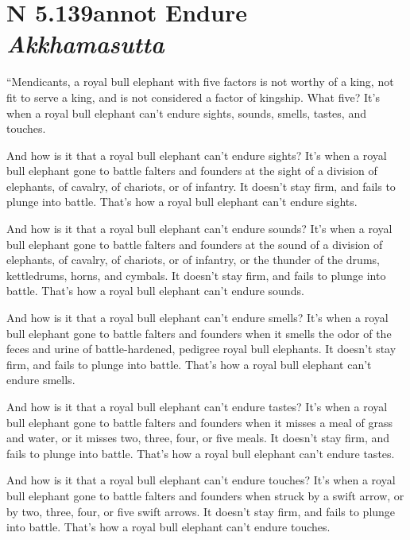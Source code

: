 \documentclass[12pt,openany]{book}%
\newcommand*{\suttatitleacronym}[1]{\smaller[2]{#1}\vspace*{.3em}}
\newcommand*{\suttatitletranslation}[1]{\linebreak{#1}}
\newcommand*{\suttatitleroot}[1]{\linebreak\smaller[2]\itshape{#1}}
\newcommand*{\tocacronym}[1]{\hspace*{-3.3em}{#1}\quad}
\newcommand*{\toctranslation}[1]{#1}
\newcommand*{\tocroot}[1]{(\textit{#1})}
\begin{document}
%
\section*{{\suttatitleacronym AN 5.139}{\suttatitletranslation Cannot Endure }{\suttatitleroot Akkhamasutta}}
\addcontentsline{toc}{section}{\tocacronym{AN 5.139} \toctranslation{Cannot Endure } \tocroot{Akkhamasutta}}

“Mendicants, a royal bull elephant with five factors is not worthy of a king, not fit to serve a king, and is not considered a factor of kingship. What five? It’s when a royal bull elephant can’t endure sights, sounds, smells, tastes, and touches. 

And how is it that a royal bull elephant can’t endure sights? It’s when a royal bull elephant gone to battle falters and founders at the sight of a division of elephants, of cavalry, of chariots, or of infantry. It doesn’t stay firm, and fails to plunge into battle. That’s how a royal bull elephant can’t endure sights. 

And how is it that a royal bull elephant can’t endure sounds? It’s when a royal bull elephant gone to battle falters and founders at the sound of a division of elephants, of cavalry, of chariots, or of infantry, or the thunder of the drums, kettledrums, horns, and cymbals. It doesn’t stay firm, and fails to plunge into battle. That’s how a royal bull elephant can’t endure sounds. 

And how is it that a royal bull elephant can’t endure smells? It’s when a royal bull elephant gone to battle falters and founders when it smells the odor of the feces and urine of battle-hardened, pedigree royal bull elephants. It doesn’t stay firm, and fails to plunge into battle. That’s how a royal bull elephant can’t endure smells. 

And how is it that a royal bull elephant can’t endure tastes? It’s when a royal bull elephant gone to battle falters and founders when it misses a meal of grass and water, or it misses two, three, four, or five meals. It doesn’t stay firm, and fails to plunge into battle. That’s how a royal bull elephant can’t endure tastes. 

And how is it that a royal bull elephant can’t endure touches? It’s when a royal bull elephant gone to battle falters and founders when struck by a swift arrow, or by two, three, four, or five swift arrows. It doesn’t stay firm, and fails to plunge into battle. That’s how a royal bull elephant can’t endure touches. 
\end{document}
